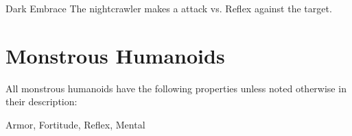     \begin{freeability}{Dark Embrace}
       The nightcrawler makes a  attack
        vs. Reflex against the target.
    \end{freeability}
  
        \section{Monstrous Humanoids}

        All monstrous humanoids have the following properties unless noted otherwise in their description:
        
    
     Armor,
     Fortitude,
     Reflex,
     Mental
  
  
      
